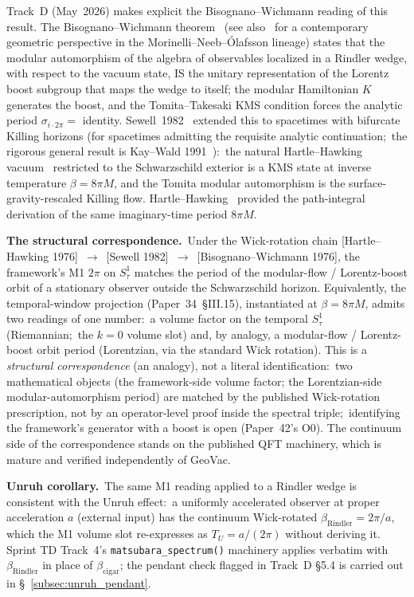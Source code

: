 \documentclass[11pt]{article}
\begin{document}
Track~D (May~2026) makes explicit the Bisognano--Wichmann reading of this
result.  The Bisognano--Wichmann theorem~\cite{bisognano_wichmann1976}
(see also~\cite{morinelli2024_geometric_aqft} for a contemporary
geometric perspective in the Morinelli--Neeb--\'Olafsson lineage)
states that the modular automorphism of the algebra of observables
localized in a Rindler wedge, with respect to the vacuum state, IS the
unitary representation of the Lorentz boost subgroup that maps the
wedge to itself; the modular Hamiltonian $K$ generates the boost, and
the Tomita--Takesaki KMS condition forces the analytic period
$\sigma_{i\cdot 2\pi} = $ identity.  Sewell~1982~\cite{sewell1982}
extended this to spacetimes with bifurcate Killing horizons (for
spacetimes admitting the requisite analytic continuation;\ the
rigorous general result is Kay--Wald 1991~\cite{kay_wald1991}):\ the natural Hartle--Hawking
vacuum~\cite{hartle_hawking1976} restricted to the Schwarzschild
exterior is a KMS state at inverse temperature $\beta = 8\pi M$, and
the Tomita modular automorphism is the surface-gravity-rescaled Killing
flow.  Hartle--Hawking~\cite{hartle_hawking1976} provided the
path-integral derivation of the same imaginary-time period $8\pi M$.

\textbf{The structural correspondence.}\ Under the Wick-rotation chain
[Hartle--Hawking 1976]~$\to$~[Sewell 1982]~$\to$~[Bisognano--Wichmann
1976], the framework's M1 $2\pi$ on $S^1_\tau$ matches the period of the
modular-flow / Lorentz-boost orbit of a stationary observer outside the
Schwarzschild horizon.  Equivalently, the temporal-window projection
(Paper~34~§III.15), instantiated at
$\beta = 8\pi M$, admits two readings of one number:\ a volume factor
on the temporal $S^1_\tau$ (Riemannian;\ the $k = 0$ volume slot) and, by
analogy, a modular-flow / Lorentz-boost orbit period (Lorentzian, via
the standard Wick rotation).  This is a \emph{structural correspondence}
(an analogy), not a
literal identification:\ two mathematical objects (the framework-side
volume factor; the Lorentzian-side modular-automorphism
period) are matched by the published Wick-rotation prescription, not
by an operator-level proof inside the spectral triple;\ identifying the
framework's generator with a boost is open (Paper~42's O0).  The
continuum side of the correspondence stands on the published QFT
machinery, which is mature and verified independently of GeoVac.

\textbf{Unruh corollary.}\ The same M1 reading applied to a Rindler
wedge is consistent with the Unruh effect:\ a uniformly accelerated
observer at proper acceleration $a$ (external input) has the continuum
Wick-rotated $\beta_{\mathrm{Rindler}} = 2\pi/a$, which the M1 volume
slot re-expresses as $T_U = a/(2\pi)$ without deriving it.  Sprint TD
Track~4's \texttt{matsubara\_spectrum()} machinery applies verbatim with
$\beta_{\mathrm{Rindler}}$ in place of $\beta_{\mathrm{cigar}}$;
the pendant check flagged in Track~D \S 5.4 is carried out in
\S~\ref{subsec:unruh_pendant}.
\end{document}

